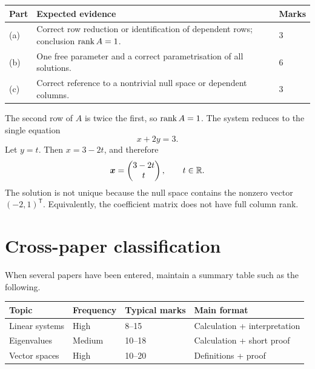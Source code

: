 \begin{markscheme}
\begin{tabularx}{\textwidth}{@{}L{18mm}Y C{18mm}@{}}
\toprule
Part & Expected evidence & Marks \\
\midrule
(a) & Correct row reduction or identification of dependent rows; conclusion $\operatorname{rank} A=1$. & 3 \\
(b) & One free parameter and a correct parametrisation of all solutions. & 6 \\
(c) & Correct reference to a nontrivial null space or dependent columns. & 3 \\
\bottomrule
\end{tabularx}
\end{markscheme}

\begin{coursesolution}
The second row of $A$ is twice the first, so $\operatorname{rank} A=1$.
The system reduces to the single equation
\[
  x+2y=3.
\]
Let $y=t$. Then $x=3-2t$, and therefore
\[
  \bm{x}=\begin{pmatrix}3-2t\\t\end{pmatrix},
  \qquad t\in\mathbb{R}.
\]
The solution is not unique because the null space contains the nonzero vector
$(-2,1)^{\mathsf T}$. Equivalently, the coefficient matrix does not have full column
rank.
\end{coursesolution}

\section{Cross-paper classification}

When several papers have been entered, maintain a summary table such as the following.

\begin{tabularx}{\textwidth}{@{}Y C{20mm} C{22mm} C{24mm}@{}}
\toprule
Topic & Frequency & Typical marks & Main format \\
\midrule
Linear systems & High & 8--15 & Calculation + interpretation \\
Eigenvalues & Medium & 10--18 & Calculation + short proof \\
Vector spaces & High & 10--20 & Definitions + proof \\
\bottomrule
\end{tabularx}
